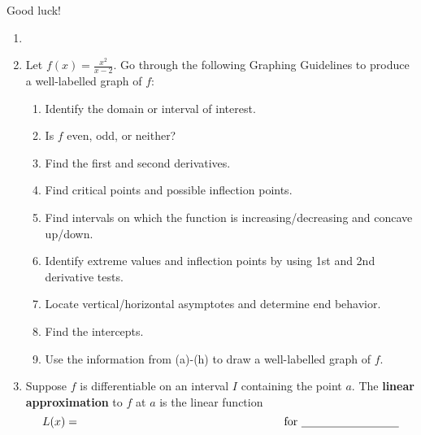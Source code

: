 \documentclass[11pt,letterpaper]{article}
\begin{document}
\vfill
\begin{flushright}\Large Good luck!\end{flushright}

\begin{enumerate}
\newpage
\item 

\newpage
\item Let $f(x)=\frac{x^2}{x-2}$.  Go through the following Graphing Guidelines to produce a well-labelled graph of $f$:  
\begin{enumerate}
\item Identify the domain or interval of interest.

\vspace{3pc}
\item Is $f$ even, odd, or neither?

\vspace{5pc}
\item Find the first and second derivatives.

\vspace{20pc}
\item Find critical points and possible inflection points.

\newpage
\item Find intervals on which the function is increasing/decreasing and concave up/down.

\vspace{20pc}
\item Identify extreme values and inflection points by using 1st and 2nd derivative tests.

\vspace{5pc}
\item Locate vertical/horizontal asymptotes and determine end behavior.

\newpage
\vspace{5pc}
\item Find the intercepts.

\vspace{10pc}
\item Use the information from (a)-(h) to draw a well-labelled graph of $f$.

\end{enumerate}

\newpage
\item Suppose $f$ is differentiable on an interval $I$ containing the point $a$.  The {\bf linear approximation} to $f$ at $a$ is the linear function
\vspace{2pc}
\[L(x)=\hspace{15pc}\text{for \underline{\hspace{20ex}}}\]


\end{enumerate}
\end{document}
